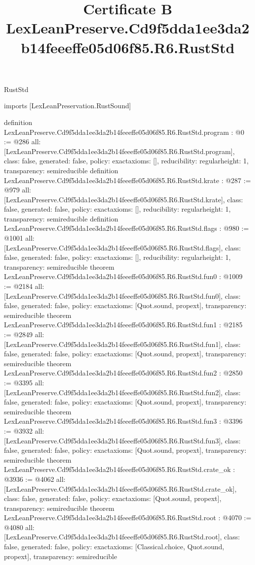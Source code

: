 \begin{lexlean}{RustStd}
\title{Certificate B LexLeanPreserve.Cd9f5dda1ee3da2b14feeeffe05d06f85.R6.RustStd}
\begin{coremodule}
imports [LexLeanPreservation.RustSound]

definition LexLeanPreserve.Cd9f5dda1ee3da2b14feeeffe05d06f85.R6.RustStd.program : @0 := @286 {
  all: [LexLeanPreserve.Cd9f5dda1ee3da2b14feeeffe05d06f85.R6.RustStd.program],
  class: false,
  generated: false,
  policy: exact{axioms: []},
  reducibility: regular{height: 1},
  transparency: semireducible
}
definition LexLeanPreserve.Cd9f5dda1ee3da2b14feeeffe05d06f85.R6.RustStd.krate : @287 := @979 {
  all: [LexLeanPreserve.Cd9f5dda1ee3da2b14feeeffe05d06f85.R6.RustStd.krate],
  class: false,
  generated: false,
  policy: exact{axioms: []},
  reducibility: regular{height: 1},
  transparency: semireducible
}
definition LexLeanPreserve.Cd9f5dda1ee3da2b14feeeffe05d06f85.R6.RustStd.flags : @980 := @1001 {
  all: [LexLeanPreserve.Cd9f5dda1ee3da2b14feeeffe05d06f85.R6.RustStd.flags],
  class: false,
  generated: false,
  policy: exact{axioms: []},
  reducibility: regular{height: 1},
  transparency: semireducible
}
theorem LexLeanPreserve.Cd9f5dda1ee3da2b14feeeffe05d06f85.R6.RustStd.fun0 : @1009 := @2184 {
  all: [LexLeanPreserve.Cd9f5dda1ee3da2b14feeeffe05d06f85.R6.RustStd.fun0],
  class: false,
  generated: false,
  policy: exact{axioms: [Quot.sound, propext]},
  transparency: semireducible
}
theorem LexLeanPreserve.Cd9f5dda1ee3da2b14feeeffe05d06f85.R6.RustStd.fun1 : @2185 := @2849 {
  all: [LexLeanPreserve.Cd9f5dda1ee3da2b14feeeffe05d06f85.R6.RustStd.fun1],
  class: false,
  generated: false,
  policy: exact{axioms: [Quot.sound, propext]},
  transparency: semireducible
}
theorem LexLeanPreserve.Cd9f5dda1ee3da2b14feeeffe05d06f85.R6.RustStd.fun2 : @2850 := @3395 {
  all: [LexLeanPreserve.Cd9f5dda1ee3da2b14feeeffe05d06f85.R6.RustStd.fun2],
  class: false,
  generated: false,
  policy: exact{axioms: [Quot.sound, propext]},
  transparency: semireducible
}
theorem LexLeanPreserve.Cd9f5dda1ee3da2b14feeeffe05d06f85.R6.RustStd.fun3 : @3396 := @3932 {
  all: [LexLeanPreserve.Cd9f5dda1ee3da2b14feeeffe05d06f85.R6.RustStd.fun3],
  class: false,
  generated: false,
  policy: exact{axioms: [Quot.sound, propext]},
  transparency: semireducible
}
theorem LexLeanPreserve.Cd9f5dda1ee3da2b14feeeffe05d06f85.R6.RustStd.crate_ok : @3936 := @4062 {
  all: [LexLeanPreserve.Cd9f5dda1ee3da2b14feeeffe05d06f85.R6.RustStd.crate_ok],
  class: false,
  generated: false,
  policy: exact{axioms: [Quot.sound, propext]},
  transparency: semireducible
}
theorem LexLeanPreserve.Cd9f5dda1ee3da2b14feeeffe05d06f85.R6.RustStd.root : @4070 := @4080 {
  all: [LexLeanPreserve.Cd9f5dda1ee3da2b14feeeffe05d06f85.R6.RustStd.root],
  class: false,
  generated: false,
  policy: exact{axioms: [Classical.choice, Quot.sound, propext]},
  transparency: semireducible
}


\end{coremodule}
\end{lexlean}
